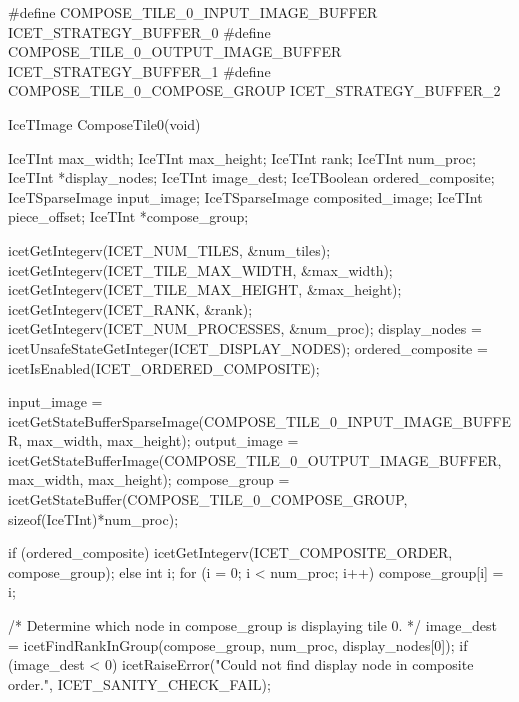 \begin{code}
#define COMPOSE_TILE_0_INPUT_IMAGE_BUFFER       ICET_STRATEGY_BUFFER_0
#define COMPOSE_TILE_0_OUTPUT_IMAGE_BUFFER      ICET_STRATEGY_BUFFER_1
#define COMPOSE_TILE_0_COMPOSE_GROUP            ICET_STRATEGY_BUFFER_2

IceTImage ComposeTile0(void)
{
  IceTInt max_width;
  IceTInt max_height;
  IceTInt rank;
  IceTInt num_proc;
  IceTInt *display_nodes;
  IceTInt image_dest;
  IceTBoolean ordered_composite;
  IceTSparseImage input_image;
  IceTSparseImage composited_image;
  IceTInt piece_offset;
  IceTInt *compose_group;

  icetGetIntegerv(ICET_NUM_TILES, &num_tiles);
  icetGetIntegerv(ICET_TILE_MAX_WIDTH, &max_width);
  icetGetIntegerv(ICET_TILE_MAX_HEIGHT, &max_height);
  icetGetIntegerv(ICET_RANK, &rank);
  icetGetIntegerv(ICET_NUM_PROCESSES, &num_proc);
  display_nodes = icetUnsafeStateGetInteger(ICET_DISPLAY_NODES);
  ordered_composite = icetIsEnabled(ICET_ORDERED_COMPOSITE);

  input_image = icetGetStateBufferSparseImage(COMPOSE_TILE_0_INPUT_IMAGE_BUFFER,
                                              max_width, max_height);
  output_image = icetGetStateBufferImage(COMPOSE_TILE_0_OUTPUT_IMAGE_BUFFER,
                                         max_width, max_height);
  compose_group = icetGetStateBuffer(COMPOSE_TILE_0_COMPOSE_GROUP,
                                     sizeof(IceTInt)*num_proc);

  if (ordered_composite) {
    icetGetIntegerv(ICET_COMPOSITE_ORDER, compose_group);
  } else {
    int i;
    for (i = 0; i < num_proc; i++) {
      compose_group[i] = i;
    }
  }

  /* Determine which node in compose_group is displaying tile 0. */
  image_dest = icetFindRankInGroup(compose_group, num_proc, display_nodes[0]);
  if (image_dest < 0) {
    icetRaiseError("Could not find display node in composite order.",
                   ICET_SANITY_CHECK_FAIL);
  }

}
\end{code}
